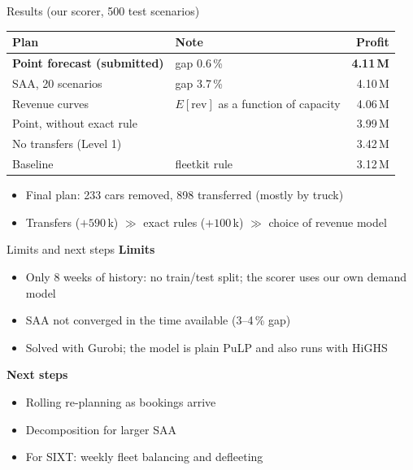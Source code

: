 \documentclass[aspectratio=169,11pt]{beamer}
\begin{document}
\begin{frame}{Results (our scorer, 500 test scenarios)}
\centering
\begin{tabular}{llr}
\toprule
Plan & Note & Profit \\
\midrule
\textbf{Point forecast (submitted)} & gap 0.6\,\% & \textbf{4.11\,M} \\
SAA, 20 scenarios & gap 3.7\,\% & 4.10\,M \\
Revenue curves & $E[\mathrm{rev}]$ as a function of capacity & 4.06\,M \\
Point, without exact rule & & 3.99\,M \\
No transfers (Level 1) & & 3.42\,M \\
Baseline & fleetkit rule & 3.12\,M \\
\bottomrule
\end{tabular}
\vspace{0.8em}

\raggedright
\begin{itemize}
  \item Final plan: 233 cars removed, 898 transferred (mostly by truck)
  \item Transfers ($+590$\,k) $\gg$ exact rules ($+100$\,k) $\gg$ choice of revenue model
\end{itemize}
\end{frame}

\begin{frame}{Limits and next steps}
\textbf{Limits}
\begin{itemize}
  \item Only 8 weeks of history: no train/test split; the scorer uses our own demand model
  \item SAA not converged in the time available (3--4\,\% gap)
  \item Solved with Gurobi; the model is plain PuLP and also runs with HiGHS
\end{itemize}
\vspace{0.5em}
\textbf{Next steps}
\begin{itemize}
  \item Rolling re-planning as bookings arrive
  \item Decomposition for larger SAA
  \item For SIXT: weekly fleet balancing and defleeting
\end{itemize}
\end{frame}
\end{document}
